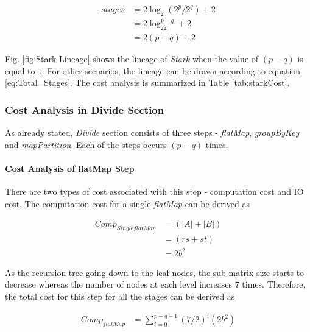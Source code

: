 \begin{equation}
    \begin{aligned}
        stages &= 2\log_2(2^{p}/2^{q}) + 2 \\
        &=2\log_22^{p-q} + 2 \\
        &=2(p-q)+2
    \end{aligned}
    \label{eq:Total_Stages}
\end{equation}

Fig. \ref{fig:Stark-Lineage} shows the lineage of \textit{Stark} when the value of $(p-q)$ is equal to $1$. For other scenarios, the lineage can be drawn according to equation \ref{eq:Total_Stages}. The cost analysis is summarized in Table \ref{tab:starkCost}.

\subsubsection{Cost Analysis in Divide Section}
As already stated, \textit{Divide} section consists of three steps - \textit{flatMap}, \textit{groupByKey} and \textit{mapPartition}. Each of the steps occurs $(p-q)$ times.

\paragraph{Cost Analysis of flatMap Step}
There are two types of cost associated with this step - computation cost and IO cost. The computation cost for a single \textit{flatMap} can be derived as

\begin{equation}
    \begin{aligned}
        Comp_{Single flatMap}&=(\left | A \right |+\left | B \right |) \\
        &=(rs+st) \\
        &=2b^{2}
    \end{aligned}
\end{equation}

As the recursion tree going down to the leaf nodes, the sub-matrix size starts to decrease whereas the number of nodes at each level increases $7$ times. Therefore, the total cost for this step for all the stages can be derived as

\begin{equation}
    \begin{aligned}
        Comp_{flatMap}&=\sum_{i=0}^{p-q-1}(7/2)^{i}(2b^{2}) \\        
    \end{aligned}
\end{equation}

